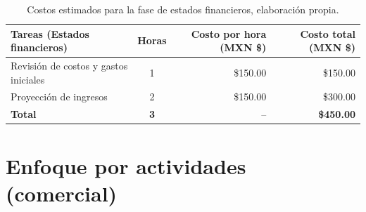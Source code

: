 \begin{table}[H]
	\centering
	\renewcommand{\arraystretch}{1.6}
	\setlength{\tabcolsep}{10pt}
	\Huge
	\begin{adjustbox}{max width=\textwidth}
		\begin{tabular}{|p{9.5cm}|c|r|r|}
			\hline
			\textbf{Tareas (Estados financieros)} & \textbf{Horas} & \textbf{Costo por hora (MXN \$)} & \textbf{Costo total (MXN \$)} \\ \hline
			Revisión de costos y gastos iniciales & 1 & \$150.00 & \$150.00 \\ \hline
			Proyección de ingresos & 2 & \$150.00 & \$300.00 \\ \hline
			\textbf{Total} & \textbf{3} & -- & \textbf{\$450.00} \\ \hline
		\end{tabular}
	\end{adjustbox}
	\caption[Costos estimados para la fase de estados financieros]{Costos estimados para la fase de estados financieros, elaboración propia.} 	
	\label{tab:costos_estados_financieros}
\end{table}

\chapter{Enfoque por actividades (comercial)}
\label{anexo:actividades_comercial}  %
